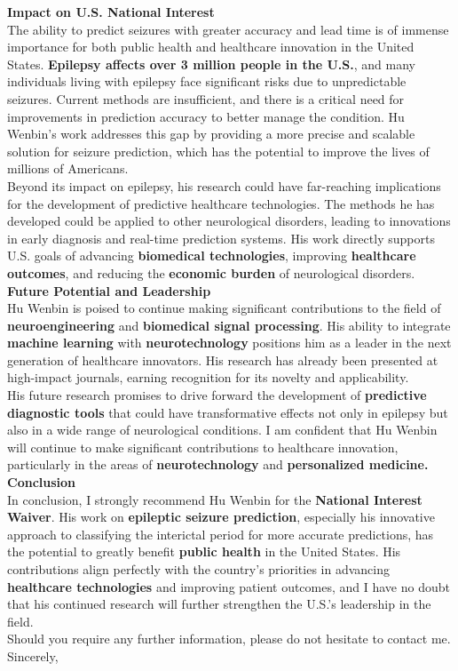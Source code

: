 \documentclass[a4paper,12pt]{article}
\begin{document}
{\bf Impact on U.S. National Interest}\\[1em]
The ability to predict seizures with greater accuracy and lead time is of immense importance for both public health and healthcare innovation in the United States. {\bf Epilepsy affects over 3 million people in the U.S.}, and many individuals living with epilepsy face significant risks due to unpredictable seizures. Current methods are insufficient, and there is a critical need for improvements in prediction accuracy to better manage the condition. Hu Wenbin’s work addresses this gap by providing a more precise and scalable solution for seizure prediction, which has the potential to improve the lives of millions of Americans.\\[1em]

Beyond its impact on epilepsy, his research could have far-reaching implications for the development of predictive healthcare technologies. The methods he has developed could be applied to other neurological disorders, leading to innovations in early diagnosis and real-time prediction systems. His work directly supports U.S. goals of advancing {\bf biomedical technologies}, improving {\bf healthcare outcomes}, and reducing the {\bf economic burden} of neurological disorders.\\[1em]

{\bf Future Potential and Leadership}\\[1em]
Hu Wenbin is poised to continue making significant contributions to the field of {\bf neuroengineering} and {\bf biomedical signal processing}. His ability to integrate {\bf machine learning} with {\bf neurotechnology} positions him as a leader in the next generation of healthcare innovators. His research has already been presented at high-impact journals, earning recognition for its novelty and applicability.\\[1em]

His future research promises to drive forward the development of {\bf predictive diagnostic tools} that could have transformative effects not only in epilepsy but also in a wide range of neurological conditions. I am confident that Hu Wenbin will continue to make significant contributions to healthcare innovation, particularly in the areas of {\bf neurotechnology} and {\bf personalized medicine.}\\[1em]

{\bf Conclusion}\\[1em]
In conclusion, I strongly recommend Hu Wenbin for the {\bf National Interest Waiver}. His work on {\bf epileptic seizure prediction}, especially his innovative approach to classifying the interictal period for more accurate predictions, has the potential to greatly benefit {\bf public health} in the United States. His contributions align perfectly with the country’s priorities in advancing {\bf healthcare technologies} and improving patient outcomes, and I have no doubt that his continued research will further strengthen the U.S.’s leadership in the field.\\[1em]

Should you require any further information, please do not hesitate to contact me.\\[1em]

Sincerely,\\[1em]
\\
[Your Title] \\
[Your Institution] \\
[Your Contact Information]
\end{document}
